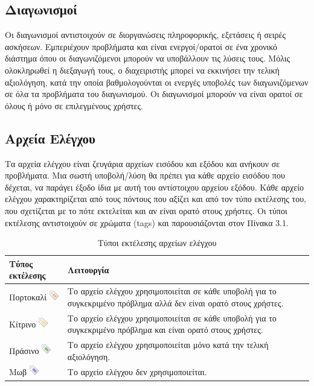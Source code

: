 \documentclass[diploma]{softlab-thesis}
\begin{document}
\subsection{Διαγωνισμοί}

Οι διαγωνισμοί αντιστοιχούν σε διοργανώσεις πληροφορικής, εξετάσεις ή σειρές
ασκήσεων. Εμπεριέχουν προβλήματα και είναι ενεργοί/ορατοί σε ένα χρονικό
διάστημα όπου οι διαγωνιζόμενοι μπορούν να υποβάλλουν τις λύσεις τους. Μόλις
ολοκληρωθεί η διεξαγωγή τους, ο διαχειριστής μπορεί να εκκινήσει την τελική
αξιολόγηση, κατά την οποία βαθμολογούνται οι ενεργές υποβολές των
διαγωνιζόμενων σε όλα τα προβλήματα του διαγωνισμού. Οι διαγωνισμοί μπορούν να
είναι ορατοί σε όλους ή μόνο σε επιλεγμένους χρήστες.

\subsection{Αρχεία Ελέγχου}

Τα αρχεία ελέγχου είναι ζευγάρια αρχείων εισόδου και εξόδου και ανήκουν σε
προβλήματα. Μια σωστή υποβολή/λύση θα πρέπει για κάθε αρχείο εισόδου που
δέχεται, να παράγει έξοδο ίδια με αυτή του αντίστοιχου αρχείου εξόδου.  Κάθε
αρχείο ελέγχου χαρακτηρίζεται από τους πόντους που αξίζει και από τον τύπο
εκτέλεσης του, που σχετίζεται με το πότε εκτελείται και αν είναι ορατό στους
χρήστες. Οι τύποι εκτέλεσης αντιστοιχούν σε χρώματα (tags) και παρουσιάζονται
στον Πίνακα 3.1.

  \begin{table}
    \begin{tabular}{ | l | p{10cm} |}
    \hline
    Τύπος εκτέλεσης & Λειτουργία \\ \hline
    Πορτοκαλί \includegraphics[scale=0.8]{Figures/tag_orange.png} &
      Το αρχείο ελέγχου χρησιμοποιείται σε κάθε υποβολή για το συγκεκριμένο πρόβλημα
      αλλά δεν είναι ορατό στους χρήστες. \\ \hline
    Κίτρινο \includegraphics[scale=0.8]{Figures/tag_yellow.png} &
      Το αρχείο ελέγχου χρησιμοποιείται σε κάθε υποβολή για το συγκεκριμένο πρόβλημα
      και είναι ορατό στους χρήστες. \\ \hline
    Πράσινο \includegraphics[scale=0.8]{Figures/tag_green.png} &
      Το αρχείο ελέγχου χρησιμοποιείται μόνο κατά την τελική αξιολόγηση. \\ \hline
    Μωβ \includegraphics[scale=0.8]{Figures/tag_purple.png} &
      Το αρχείο ελέγχου δεν χρησιμοποιείται. \\ \hline
    \end{tabular}
  \caption{Τύποι εκτέλεσης αρχείων ελέγχου}
  \end{table}
\end{document}
